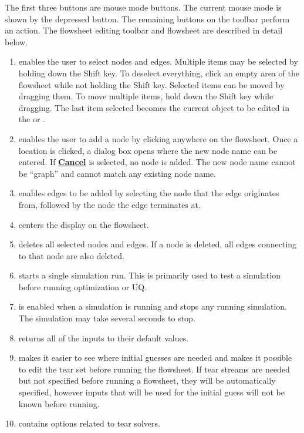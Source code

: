 The first three buttons are mouse mode buttons.  The current mouse mode is shown by the depressed button. The remaining buttons on the toolbar perform an action. The flowsheet editing toolbar and flowsheet are described in detail below.
\begin{enumerate}
	\item {} enables the user to select nodes and edges. Multiple items may be selected by holding down the Shift key. To deselect everything, click an empty area of the flowsheet while not holding the Shift key. Selected items can be moved by dragging them. To move multiple items, hold down the Shift key while dragging. The last item selected becomes the current object to be edited in the  or .
	\item {} enables the user to add a node by clicking anywhere on the flowsheet. Once a location is clicked, a dialog box opens where the new node name can be entered. If \textbf{\underline{Cancel}} is selected, no node is added. The new node name cannot be ``graph'' and cannot match any existing node name.
	\item {} enables edges to be added by selecting the node that the edge originates from, followed by the node the edge terminates at.
	\item {} centers the display on the flowsheet.
	\item {} deletes all selected nodes and edges. If a node is deleted, all edges connecting to that node are also deleted.
	\item {} starts a single simulation run. This is primarily used to test a simulation before running optimization or UQ.
	\item {} is enabled when a simulation is running and stops any running simulation. The simulation may take several seconds to stop.
	\item {} returns all of the inputs to their default values.
	\item {} makes it easier to see where initial guesses are needed and makes it possible to edit the tear set before running the flowsheet.  If tear streams are needed but not specified before running a flowsheet, they will be automatically specified, however inputs that will be used for the initial guess will not be known before running.
	\item {} contains options related to tear solvers.

\end{enumerate}
